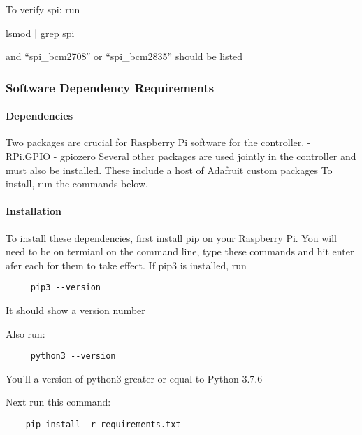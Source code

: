 \documentclass[
]{article}
\newenvironment{Shaded}{}{}
\newcommand{\FunctionTok}[1]{\textcolor[rgb]{0.02,0.16,0.49}{#1}}
\newcommand{\KeywordTok}[1]{\textcolor[rgb]{0.00,0.44,0.13}{\textbf{#1}}}
\newcommand{\NormalTok}[1]{#1}
\begin{document}
To verify spi: run

\begin{Shaded}
\begin{Highlighting}[]
\FunctionTok{lsmod} \KeywordTok{|} \FunctionTok{grep}\NormalTok{ spi\_}
\end{Highlighting}
\end{Shaded}

and ``spi\_bcm2708″ or ``spi\_bcm2835'' should be listed

\hypertarget{software-dependency-requirements}{%
\subsubsection{Software Dependency
Requirements}\label{software-dependency-requirements}}

\hypertarget{dependencies}{%
\paragraph{Dependencies}\label{dependencies}}

Two packages are crucial for Raspberry Pi software for the controller. -
RPi.GPIO - gpiozero Several other packages are used jointly in the
controller and must also be installed. These include a host of Adafruit
custom packages To install, run the commands below.

\hypertarget{installation}{%
\paragraph{Installation}\label{installation}}

To install these dependencies, first install pip on your Raspberry Pi.
You will need to be on termianl on the command line, type these commands
and hit enter afer each for them to take effect. If pip3 is installed,
run

\begin{verbatim}
     pip3 --version 
\end{verbatim}

It should show a version number

Also run:

\begin{verbatim}
     python3 --version
\end{verbatim}

You'll a version of python3 greater or equal to Python 3.7.6

Next run this command:

\begin{verbatim}
    pip install -r requirements.txt
\end{verbatim}
\end{document}
